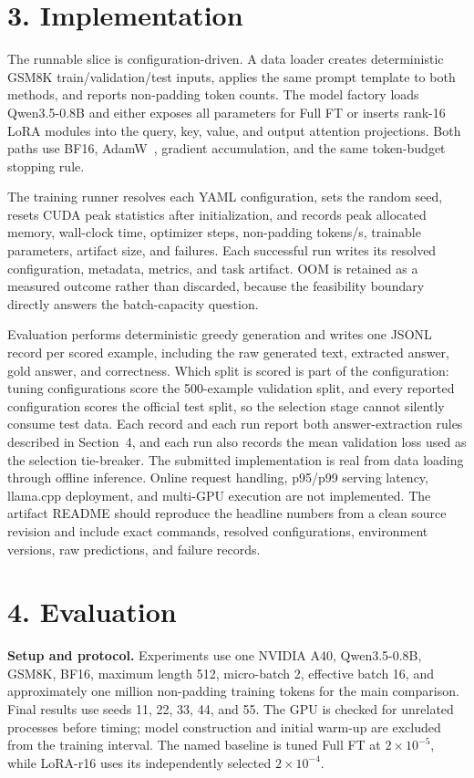 \documentclass[10pt]{article}
\begin{document}
\section*{3. Implementation}

The runnable slice is configuration-driven. A data loader creates deterministic GSM8K train/validation/test inputs, applies the same prompt template to both methods, and reports non-padding token counts. The model factory loads Qwen3.5-0.8B and either exposes all parameters for Full FT or inserts rank-16 LoRA modules into the query, key, value, and output attention projections. Both paths use BF16, AdamW~\cite{loshchilov2019adamw}, gradient accumulation, and the same token-budget stopping rule.

The training runner resolves each YAML configuration, sets the random seed, resets CUDA peak statistics after initialization, and records peak allocated memory, wall-clock time, optimizer steps, non-padding tokens/s, trainable parameters, artifact size, and failures. Each successful run writes its resolved configuration, metadata, metrics, and task artifact. OOM is retained as a measured outcome rather than discarded, because the feasibility boundary directly answers the batch-capacity question.

Evaluation performs deterministic greedy generation and writes one JSONL record per scored example, including the raw generated text, extracted answer, gold answer, and correctness. Which split is scored is part of the configuration: tuning configurations score the 500-example validation split, and every reported configuration scores the official test split, so the selection stage cannot silently consume test data. Each record and each run report both answer-extraction rules described in Section~4, and each run also records the mean validation loss used as the selection tie-breaker. The submitted implementation is real from data loading through offline inference. Online request handling, p95/p99 serving latency, llama.cpp deployment, and multi-GPU execution are not implemented. The artifact README should reproduce the headline numbers from a clean source revision and include exact commands, resolved configurations, environment versions, raw predictions, and failure records.

\section*{4. Evaluation}

\textbf{Setup and protocol.} Experiments use one NVIDIA A40, Qwen3.5-0.8B, GSM8K, BF16, maximum length 512, micro-batch 2, effective batch 16, and approximately one million non-padding training tokens for the main comparison. Final results use seeds 11, 22, 33, 44, and 55. The GPU is checked for unrelated processes before timing; model construction and initial warm-up are excluded from the training interval. The named baseline is tuned Full FT at $2\times10^{-5}$, while LoRA-r16 uses its independently selected $2\times10^{-4}$.
\end{document}

